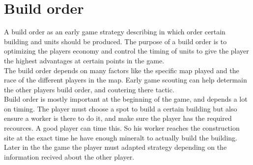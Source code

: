 \section{Build order}
A build order as an early game strategy describing in which order certain building and units should be produced\cite{wiki_build_order}. The purpose of a build order is to optimizing the players economy and control the timing of units to give the player the highest advantages at certain points in the game.\\
The build order depends on many factors like the specific map played and the race of the different players in the map. 
Early game scouting can help determain the other players build order, and coutering there tactic.\\

Build order is mostly important at the beginning of the game, and depends a lot on timing. The player must choose a spot to build a certain building but also ensure a worker is there to do it, and make sure the player has the required recources. A good player can time this. So his worker reaches the construction site at the exact time he have enough mineralt to actually build the building.\\

Later in the the game the player must adapted strategy depending on the information recived about the other player.





